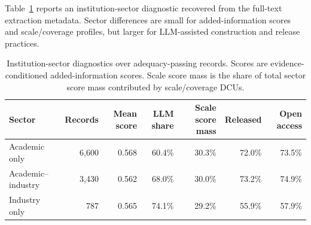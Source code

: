 \documentclass[11pt]{article}
\begin{document}
Table~\ref{tab:sector_diagnostics_appendix} reports an institution-sector diagnostic recovered from the full-text extraction metadata.
Sector differences are small for added-information scores and scale/coverage profiles, but larger for LLM-assisted construction and release practices.
\begin{table}[h]
\centering
\small
\setlength{\tabcolsep}{4pt}
\begin{tabular}{lrrrrrr}
\toprule
Sector & Records & Mean score & LLM share & Scale score mass & Released & Open access \\
\midrule
Academic only & 6,600 & 0.568 & 60.4\% & 30.3\% & 72.0\% & 73.5\% \\
Academic--industry & 3,430 & 0.562 & 68.0\% & 30.0\% & 73.2\% & 74.9\% \\
Industry only & 787 & 0.565 & 74.1\% & 29.2\% & 55.9\% & 57.9\% \\
\bottomrule
\end{tabular}
\caption{
Institution-sector diagnostics over adequacy-passing records.
Scores are evidence-conditioned added-information scores.
Scale score mass is the share of total sector score mass contributed by scale/coverage DCUs.
}
\label{tab:sector_diagnostics_appendix}
\end{table}
\end{document}
